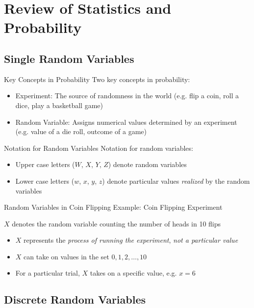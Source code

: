 \documentclass[aspectratio=169,t,11pt,table]{beamer}
\begin{document}
\section{Review of Statistics and Probability}
\subsection*{Single Random Variables}



\begin{frame}{Key Concepts in Probability}
  Two key concepts in probability:
  \begin{itemize}
    \item \alert{Experiment}: The source of randomness in the world (e.g. flip a coin, roll a dice, play a basketball game)
    \item \alert{Random Variable}: Assigns numerical values determined by an experiment (e.g. value of a die roll, outcome of a game)
  \end{itemize}
\end{frame}

\begin{frame}{Notation for Random Variables}
  Notation for random variables:
  \begin{itemize}
    \item Upper case letters ($W$, $X$, $Y$, $Z$) denote random variables
    \item Lower case letters ($w$, $x$, $y$, $z$) denote particular values \emph{realized} by the random variables
  \end{itemize}
\end{frame}

\begin{frame}{Random Variables in Coin Flipping}
  Example: Coin Flipping Experiment

  \bigskip
  $X$ denotes the random variable counting the number of heads in 10 flips
  \begin{itemize}
    \item $X$ represents the \emph{process of running the experiment}, \emph{not a particular value}
    \item $X$ can take on values in the set ${0, 1, 2, \dots, 10}$
    \item For a particular trial, $X$ takes on a specific value, e.g. $x = 6$
  \end{itemize}
\end{frame}

\subsection*{Discrete Random Variables}
\end{document}
